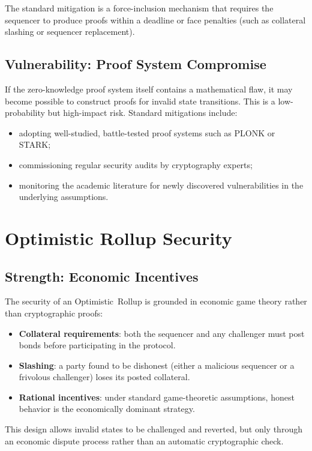 \documentclass[
]{elteikthesis}[2024/04/26]
\begin{document}
The standard mitigation is a force-inclusion mechanism that requires the sequencer to produce proofs within a deadline or face penalties (such as collateral slashing or sequencer replacement).

\subsection{Vulnerability: Proof System Compromise}

If the zero-knowledge proof system itself contains a mathematical flaw, it may become possible to construct proofs for invalid state transitions. This is a low-probability but high-impact risk. Standard mitigations include:
\begin{itemize}
    \item adopting well-studied, battle-tested proof systems such as PLONK or STARK;
    \item commissioning regular security audits by cryptography experts;
    \item monitoring the academic literature for newly discovered vulnerabilities in the underlying assumptions.
\end{itemize}

\section{Optimistic Rollup Security}

\subsection{Strength: Economic Incentives}

The security of an Optimistic~Rollup is grounded in economic game theory rather than cryptographic proofs:
\begin{itemize}
    \item \textbf{Collateral requirements}: both the sequencer and any challenger must post bonds before participating in the protocol.
    \item \textbf{Slashing}: a party found to be dishonest (either a malicious sequencer or a frivolous challenger) loses its posted collateral.
    \item \textbf{Rational incentives}: under standard game-theoretic assumptions, honest behavior is the economically dominant strategy.
\end{itemize}

This design allows invalid states to be challenged and reverted, but only through an economic dispute process rather than an automatic cryptographic check.
\end{document}
